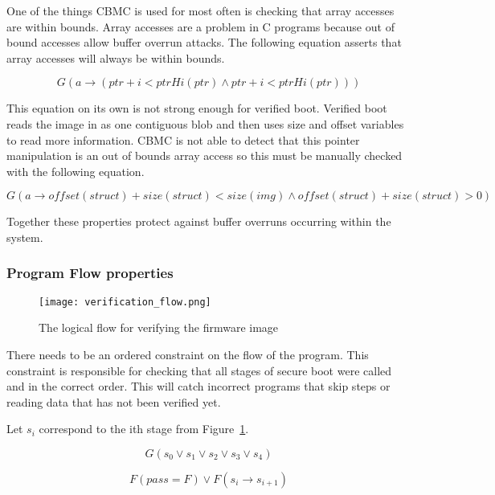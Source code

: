 \documentclass[../report.tex]{subfiles}
\begin{document}
One of the things CBMC is used for most often is checking that array accesses are within bounds.
Array accesses are a problem in C programs because out of bound accesses allow buffer overrun attacks.
The following equation asserts that array accesses will always be within bounds.

\begin{equation}
    G(a \to (ptr + i < ptrHi(ptr) \land ptr + i < ptrHi(ptr)))
\end{equation}

This equation on its own is not strong enough for verified boot. 
Verified boot reads the image in as one contiguous blob and then uses size and offset variables to read more information.
CBMC is not able to detect that this pointer manipulation is an out of bounds array access so this must be manually checked with the following equation.

\begin{equation}
    G(a \to offset(struct) + size(struct) < size(img) \land offset(struct) + size(struct) > 0)
\end{equation}

Together these properties protect against buffer overruns occurring within the system.

\subsubsection{Program Flow properties}

\begin{figure}
  \centering
  \texttt{[image: verification\_flow.png]}
  \caption{The logical flow for verifying the firmware image}\label{fig:verif_flow}
\end{figure}

There needs to be an ordered constraint on the flow of the program. 
This constraint is responsible for checking that all stages of secure boot were called and in the correct order.
This will catch incorrect programs that skip steps or reading data that has not been verified yet.

Let $s_i$ correspond to the ith stage from Figure~\ref{fig:verif_flow}.

\begin{equation}
    G(s_0 \lor s_1 \lor s_2 \lor s_3 \lor s_4)
\end{equation}

\begin{equation}
    F(pass = F) \lor F(s_i \to s_{i+1})
\end{equation}
\end{document}
